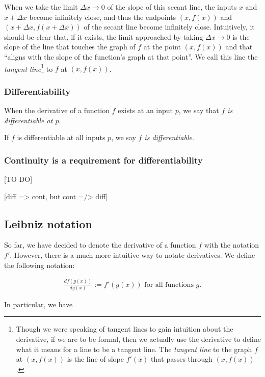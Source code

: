 When we take the limit $\Delta x \rightarrow 0$ of the slope of this secant line, the inputs $x$ and $x + \Delta x$ become infinitely close, and thus the endpoints $(x, f(x))$ and $(x + \Delta x, f(x + \Delta x))$ of the secant line become infinitely close. Intuitively, it should be clear that, if it exists, the limit approached by taking $\Delta x \rightarrow 0$ is the slope of the line that touches the graph of $f$ at the point $(x, f(x))$ and that ``aligns with the slope of the function's graph at that point''. We call this line the \textit{tangent line}\footnote{Though we were speaking of tangent lines to gain intuition about the derivative, if we are to be formal, then we actually use the derivative to define what it means for a line to be a tangent line. The \textit{tangent line} to the graph $f$ at $(x, f(x))$ is the line of slope $f'(x)$ that passes through $(x, f(x))$.} to $f$ at $(x, f(x))$.

\subsubsection*{Differentiability}

When the derivative of a function $f$ exists at an input $p$, we say that \textit{$f$ is differentiable at $p$}.

If $f$ is differentiable at all inputs $p$, we say \textit{$f$ is differentiable}.

\subsubsection*{Continuity is a requirement for differentiability}

[TO DO]

[diff => cont, but cont =/> diff]

\subsection*{Leibniz notation}
     
So far, we have decided to denote the derivative of a function $f$ with the notation $f'$. However, there is a much more intuitive way to notate derivatives. We define the following notation:

\begin{align*}
    \frac{df(g(x))}{dg(x)} := f'(g(x)) \text{ for all functions $g$}. 
\end{align*}

In particular, we have

